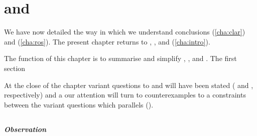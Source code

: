 \chapter{\qWhyV{} and \qHowV{}}
\label{cha:var}


\begin{note}
  We have now detailed the way in which we understand conclusions (\autoref{cha:clar}) and \ros{} (\autoref{cha:ros}).
  The present chapter returns to \qWhy{}, \qHow{}, and \issueInclusion{} (\autoref{cha:intro}).

  The function of this chapter is to summarise and simplify \qWhy{}, \qHow{}, and \issueInclusion{}.
  The first section 
  

  At the close of the chapter variant questions to \qWhy{} and \qHow{} will have been stated (\qWhyV{} and \qHowV{}, respectively) and a our attention will turn to counterexamples to a constraints between the variant questions which parallels \issueInclusion{} (\issueConstraint{}).
\end{note}

\section{\qWhyV{}}
\label{cha:var:qwhyvnp}


\paragraph*{Observation}


